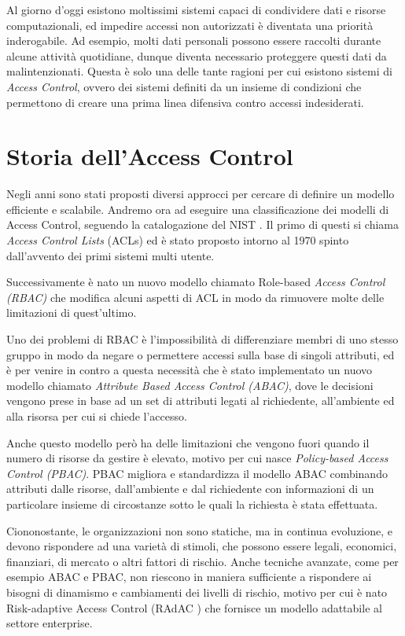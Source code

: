 \newcommand{\radac}{RAdAC\ }
\label{cap:accessControl}
Al giorno d’oggi esistono moltissimi sistemi capaci di condividere dati e
risorse computazionali, ed impedire accessi non autorizzati è diventata
una priorità inderogabile. Ad esempio, molti dati personali possono essere
raccolti durante alcune attività quotidiane, dunque diventa necessario
proteggere questi dati da malintenzionati. Questa è solo una delle tante
ragioni per cui esistono sistemi di \textit{Access Control}, ovvero dei sistemi
definiti da un insieme di condizioni che permettono di creare una prima
linea difensiva contro accessi indesiderati.

\section{Storia dell'Access Control}
\label{sec:history}



Negli anni sono stati proposti diversi approcci per cercare di definire un
modello efficiente e scalabile. Andremo ora ad eseguire una classificazione
dei modelli di Access Control, seguendo la catalogazione del NIST \cite{NISTACM}.
Il primo di questi si chiama
\textit{Access Control Lists} (ACLs) ed è stato proposto intorno al 1970 spinto
dall’avvento dei primi sistemi multi utente.\par
Successivamente è nato un nuovo modello chiamato Role-based \textit{Access
Control (RBAC)} che modifica alcuni aspetti di ACL in modo da rimuovere
molte delle limitazioni di quest’ultimo.\par
Uno dei problemi di RBAC è l’impossibilità di differenziare membri
di uno stesso gruppo in modo da negare o permettere accessi sulla base
di singoli attributi, ed è per venire in contro a questa necessità che è
stato implementato un nuovo modello chiamato \textit{Attribute Based Access
Control (ABAC)}, dove le decisioni vengono prese in base ad un set di
attributi legati al richiedente, all’ambiente ed alla risorsa per cui si chiede
l’accesso.\par
Anche questo modello però ha delle limitazioni che vengono fuori
quando il numero di risorse da gestire è elevato, motivo per cui nasce
\textit{Policy-based Access Control (PBAC)}. PBAC migliora e standardizza il
modello ABAC combinando attributi dalle risorse, dall’ambiente e dal
richiedente con informazioni di un particolare insieme di circostanze
sotto le quali la richiesta è stata effettuata.\par
Ciononostante, le organizzazioni non sono statiche, ma in continua evoluzione, e devono rispondere
ad una varietà di stimoli, che possono essere legali, economici, finanziari,
di mercato o altri fattori di rischio. Anche tecniche avanzate,
come per esempio ABAC e PBAC, non riescono in maniera sufficiente a
rispondere ai bisogni di dinamismo e cambiamenti dei livelli di rischio,
motivo per cui è nato Risk-adaptive Access Control (RAdAC ) che fornisce
un modello adattabile al settore enterprise.


